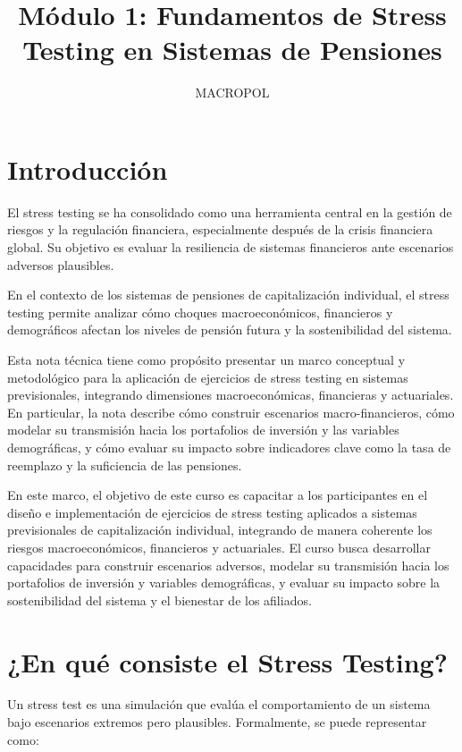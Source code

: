 \documentclass[11pt]{article}
\title{Módulo 1: Fundamentos de Stress Testing en Sistemas de Pensiones}
\author{MACROPOL}
\date{}
\begin{document}
\maketitle


\section{Introducción}

El stress testing se ha consolidado como una herramienta central en la gestión de riesgos y la regulación financiera, especialmente después de la crisis financiera global. Su objetivo es evaluar la resiliencia de sistemas financieros ante escenarios adversos plausibles.

En el contexto de los sistemas de pensiones de capitalización individual, el stress testing permite analizar cómo choques macroeconómicos, financieros y demográficos afectan los niveles de pensión futura y la sostenibilidad del sistema.

Esta nota técnica tiene como propósito presentar un marco conceptual y metodológico para la aplicación de ejercicios de stress testing en sistemas previsionales, integrando dimensiones macroeconómicas, financieras y actuariales. En particular, la nota describe cómo construir escenarios macro-financieros, cómo modelar su transmisión hacia los portafolios de inversión y las variables demográficas, y cómo evaluar su impacto sobre indicadores clave como la tasa de reemplazo y la suficiencia de las pensiones.

En este marco, el objetivo de este curso es capacitar a los participantes en el diseño e implementación de ejercicios de stress testing aplicados a sistemas previsionales de capitalización individual, integrando de manera coherente los riesgos macroeconómicos, financieros y actuariales. El curso busca desarrollar capacidades para construir escenarios adversos, modelar su transmisión hacia los portafolios de inversión y variables demográficas, y evaluar su impacto sobre la sostenibilidad del sistema y el bienestar de los afiliados.

\section{¿En qué consiste el Stress Testing?}

Un stress test es una simulación que evalúa el comportamiento de un sistema bajo escenarios extremos pero plausibles. Formalmente, se puede representar como:
\end{document}

